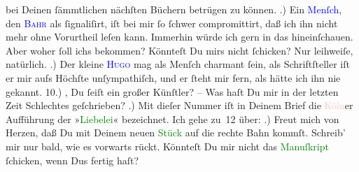                bei Deinen ſämmtlichen nächſten Büchern betrügen zu können.\pend
           .) Ein \textcolor{blue}{Menſch}{}, den \textsc{\textcolor{blue}{Bahr}{}\ledrightnote{\textcolor{blue}{Hermann Bahr}}} als \label{K_L02774-7v}\label{K_L02774-7h} ſignaliſirt, iſt bei mir ſo ſchwer {\pb}compromittirt, daß ich ihn \strikeout{\textcolor{gray}{×}} nicht mehr ohne Vorurtheil leſen kann. Immerhin würde ich gern in das \label{K_L02774-99v}\label{K_L02774-99h} hineinſchauen. Aber woher ſoll ichs bekommen? Könnteſt Du mirs
               nicht ſchicken? Nur leihweiſe, natürlich.\pend
           .) Der kleine \textsc{\textcolor{blue}{Hugo}{}\ledrightnote{\textcolor{blue}{Hugo von Hofmannsthal}}} mag als Menſch charmant ſein, als Schriftſteller iſt er mir aufs Höchſte
               unſympathiſch, und er ſteht mir fern, als hätte ich ihn nie gekannt.\pend
           \pstart
           {\pb}10.) \label{K_L02774-9v}\label{K_L02774-9h}, Du ſeiſt ein großer Künſtler? – Was haſt Du mir in der letzten Zeit
               Schlechtes geſchrieben?\pend
           .) Mit dieſer  Nummer iſt in Deinem Brief die \textcolor{pink}{Köln}{}\ledrightnote{\textcolor{pink}{Köln}}er
               Aufführung der »\textcolor{green}{Liebelei}{}\ledrightnote{\textcolor{green}{Liebelei. Schauspiel in drei Akten}}« bezeichnet. Ich gehe
               zu 12 über:\pend
           .) Freut mich von Herzen, daß Du mit Deinem neuen \textcolor{green}{Stück}{} auf die rechte Bahn kommſt. Schreib’ mir nur bald, wie
                   es vorwarts rückt. Könnteſt {\pb}Du mir nicht das \textcolor{green}{Manuſkript}{} ſchicken, wenn Dus fertig haſt?\pend
